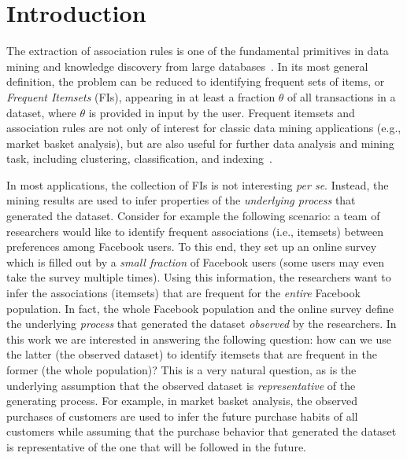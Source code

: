 \section{Introduction}\label{sec:intro}

The extraction of association rules is one of the fundamental primitives in data
mining and knowledge discovery from large databases~\citep{AgrawalIS93}.  In its
most general definition, the problem can be reduced to identifying frequent sets
of items, or \emph{Frequent Itemsets} (FIs), appearing in at least a fraction
$\theta$ of all transactions in a dataset, where $\theta$ is provided in input
by the user. Frequent itemsets and association rules are not only of interest
for classic data mining applications (e.g., market basket analysis), but are
also useful for further data analysis and mining task, including clustering,
classification, and indexing~\citep{han2006data,HanCXY07}.

In most applications, the collection of FIs is not interesting \emph{per se}.
Instead, the mining results are used to infer properties of the \emph{underlying
process} that generated the dataset. Consider for example the following
scenario: a team of researchers would like to identify frequent associations
(i.e., itemsets) between preferences among Facebook users. To this end, they set
up an online survey which is filled out by a \emph{small fraction} of Facebook
users (some users may even take the survey multiple times). Using this
information, the researchers want to infer the associations (itemsets) that are
frequent for the \emph{entire} Facebook population. In fact, the whole Facebook
population and the online survey define the underlying \emph{process} that
generated the dataset \emph{observed} by the researchers. In this work we are
interested in answering the following question: how can we use the latter (the
observed dataset) to identify itemsets that are frequent in the former (the
whole population)? This is a very natural question, as is the underlying
assumption that the observed dataset is \emph{representative} of the generating
process. For example, in market basket analysis, the observed purchases of
customers are used to infer the future purchase habits of all customers while
assuming that the purchase behavior that generated the dataset is representative
of the one that will be followed in the future.

